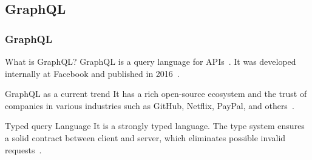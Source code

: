 \subsection{GraphQL}

\begin{frame}\frametitle{GraphQL}

  \begin{block}{What is GraphQL?}
    GraphQL is a query language for APIs~\cite{gql-spec}. It was developed internally at  Facebook and published in 2016~\cite{initial-analysis-of-gql}. 
  \end{block}

  \begin{block}{GraphQL as a current trend}
    It has a rich open-source ecosystem and the trust of companies in various industries such as GitHub, Netflix, PayPal, and others~\cite{morph-gql-1,gql-healthcare}.
  \end{block}

\begin{block}{Typed query Language}
  It is a strongly typed language. The type system ensures a solid contract between client and server, which eliminates possible invalid requests~\cite{real-time-sys-arc-based-on-gql}.
\end{block}

\end{frame}

